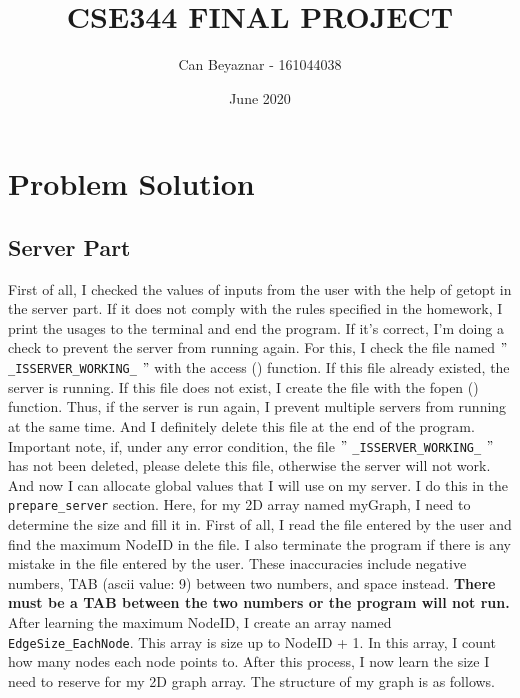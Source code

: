 \documentclass{article}
\title{CSE344 FINAL PROJECT}
\author{Can Beyaznar - 161044038}
\date{June 2020}
\begin{document}
\maketitle

\section{Problem Solution}
\subsection{Server Part}

First of all, I checked the values of inputs from the user with the help of getopt in the server part. If it does not comply with the rules specified in the homework, I print the usages to the terminal and end the program. If it's correct, I'm doing a check to prevent the server from running again. For this, I check the file named 
$"$ \texttt{\_ISSERVER\_WORKING\_} $"$ 
with the access () function. If this file already existed, the server is running. If this file does not exist, I create the file with the fopen () function. Thus, if the server is run again, I prevent multiple servers from running at the same time. And I definitely delete this file at the end of the program. Important note, if, under any error condition, the file 
$"$ \texttt{\_ISSERVER\_WORKING\_} $"$ 
has not been deleted, please delete this file, otherwise the server will not work.
\newline
And now I can allocate global values that I will use on my server. I do this in the \texttt{prepare\_server} section. Here, for my 2D array named myGraph, I need to determine the size and fill it in. First of all, I read the file entered by the user and find the maximum NodeID in the file. I also terminate the program if there is any mistake in the file entered by the user. These inaccuracies include negative numbers, TAB (ascii value: 9) between two numbers, and space instead. \textbf{There must be a TAB between the two numbers or the program will not run.}  After learning the maximum NodeID, I create an array named \texttt{EdgeSize\_EachNode}. This array is size up to NodeID + 1. In this array, I count how many nodes each node points to. After this process, I now learn the size I need to reserve for my 2D graph array. The structure of my graph is as follows.
\end{document}

